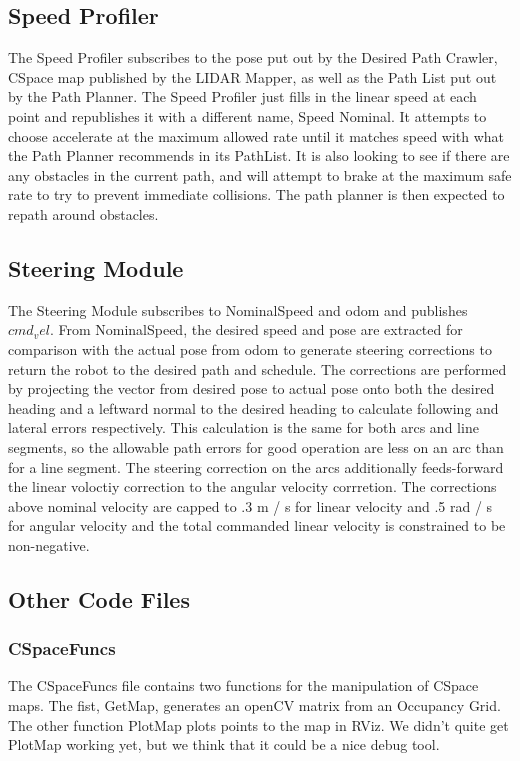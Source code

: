 \documentclass{article}
\begin{document}
\subsection{Speed Profiler}

The Speed Profiler subscribes to the pose put out by the Desired Path Crawler, CSpace map published by the LIDAR Mapper, as well as the Path List put out by the Path Planner.
The Speed Profiler just fills in the linear speed at each point and republishes it with a different name, Speed Nominal.
It attempts to choose accelerate at the maximum allowed rate until it matches speed with what the Path Planner recommends in its PathList.
It is also looking to see if there are any obstacles in the current path, and will attempt to brake at the maximum safe rate to try to prevent immediate collisions.
The path planner is then expected to repath around obstacles.


\subsection{Steering Module}

The Steering Module subscribes to NominalSpeed and odom and publishes $cmd_vel$.
From NominalSpeed, the desired speed and pose are extracted for comparison with the actual pose from odom to generate steering corrections to return the robot to the desired path and schedule.
The corrections are performed by projecting the vector from desired pose to actual pose onto both the desired heading and a leftward normal to the desired heading to calculate following and lateral errors respectively.
This calculation is the same for both arcs and line segments, so the allowable path errors for good operation are less on an arc than for a line segment.
The steering correction on the arcs additionally feeds-forward the linear voloctiy correction to the angular velocity corrretion.
The corrections above nominal velocity are capped to .3 m / s for linear velocity and .5 rad / s for angular velocity and the total commanded linear velocity is constrained to be non-negative.

\subsection{Other Code Files}
\subsubsection{CSpaceFuncs}
The CSpaceFuncs file contains two functions for the manipulation of CSpace maps.  The fist, GetMap, generates an openCV matrix from an Occupancy Grid.  The other function PlotMap plots points to the map in RViz.  We didn't quite get PlotMap working yet, but we think that it could be a nice debug tool.
\end{document}
